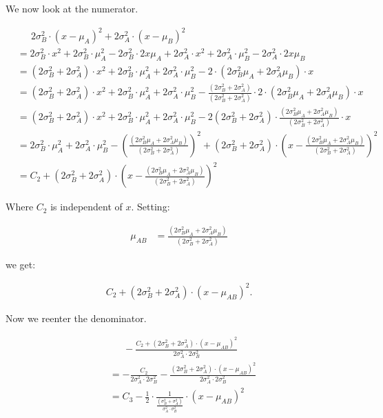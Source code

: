 We now look at the numerator.

\begin{align*}
&\phantom{\text{ = }} 2\sigma_B^2 \cdot (x-\mu_A)^2+2\sigma_A^2 \cdot (x-\mu_B)^2 \\
&=
2\sigma_B^2 \cdot x^2 + 2\sigma_B^2 \cdot \mu_A^2 - 2\sigma_B^2 \cdot 2x\mu_A +
2\sigma_A^2 \cdot x^2 + 2\sigma_A^2 \cdot \mu_B^2 - 2\sigma_A^2 \cdot 2x\mu_B \\
&=
(2\sigma_B^2 + 2\sigma_A^2) \cdot x^2 +
2\sigma_B^2 \cdot \mu_A^2 + 2\sigma_A^2 \cdot \mu_B^2 -
2 \cdot (2\sigma_B^2 \mu_A + 2\sigma_A^2 \mu_B) \cdot x \\
&=
(2\sigma_B^2 + 2\sigma_A^2) \cdot x^2 +
2\sigma_B^2 \cdot \mu_A^2 + 2\sigma_A^2 \cdot \mu_B^2 -
\frac{(2\sigma_B^2 + 2\sigma_A^2)}{(2\sigma_B^2 + 2\sigma_A^2)} \cdot
2 \cdot (2\sigma_B^2 \mu_A + 2\sigma_A^2 \mu_B) \cdot x \\
&=
(2\sigma_B^2 + 2\sigma_A^2) \cdot x^2 +
2\sigma_B^2 \cdot \mu_A^2 + 2\sigma_A^2 \cdot \mu_B^2 -
2 (2\sigma_B^2 + 2\sigma_A^2) \cdot
\frac{(2\sigma_B^2 \mu_A + 2\sigma_A^2 \mu_B)}{(2\sigma_B^2 + 2\sigma_A^2)} \cdot x \\
&=
2\sigma_B^2 \cdot \mu_A^2 + 2\sigma_A^2 \cdot \mu_B^2 -
\left( \frac{(2\sigma_B^2 \mu_A + 2\sigma_A^2 \mu_B)}{(2\sigma_B^2 + 2\sigma_A^2)} \right)^2 +
(2\sigma_B^2 + 2\sigma_A^2) \cdot
\left (x - \frac{(2\sigma_B^2 \mu_A + 2\sigma_A^2 \mu_B)}{(2\sigma_B^2 + 2\sigma_A^2)}\right)^2 \\
&=
C_2 + (2\sigma_B^2 + 2\sigma_A^2) \cdot
\left(x - \frac{(2\sigma_B^2 \mu_A + 2\sigma_A^2 \mu_B)}{(2\sigma_B^2 + 2\sigma_A^2)}\right)^2
\end{align*}

Where $C_2$ is independent of $x$. Setting:

\begin{align*}
\mu_{AB} &= \frac{(2\sigma_B^2 \mu_A + 2\sigma_A^2 \mu_B)}{(2\sigma_B^2 + 2\sigma_A^2)}
\end{align*}

we get:

\begin{align*}
C_2 + (2\sigma_B^2 + 2\sigma_A^2) \cdot (x - \mu_{AB})^2.
\end{align*}

Now we reenter the denominator.

\begin{align*}
&\phantom{\text{ = }} -\frac{C_2 + (2\sigma_B^2 + 2\sigma_A^2) \cdot (x - \mu_{AB})^2}{
                             2\sigma_A^2 \cdot 2\sigma_B^2} \\
&= - \frac{C_2}{2\sigma_A^2 \cdot 2\sigma_B^2} - \frac{(2\sigma_B^2 + 2\sigma_A^2) \cdot (x - \mu_{AB})^2}{
                                                      2\sigma_A^2 \cdot 2\sigma_B^2} \\
&= C_3 - \frac{1}{2} \cdot
\frac{1}{\frac{(\sigma_B^2 + \sigma_A^2)}{\sigma_A^2 \cdot \sigma_B^2}}
\cdot (x - \mu_{AB})^2
\end{align*}

